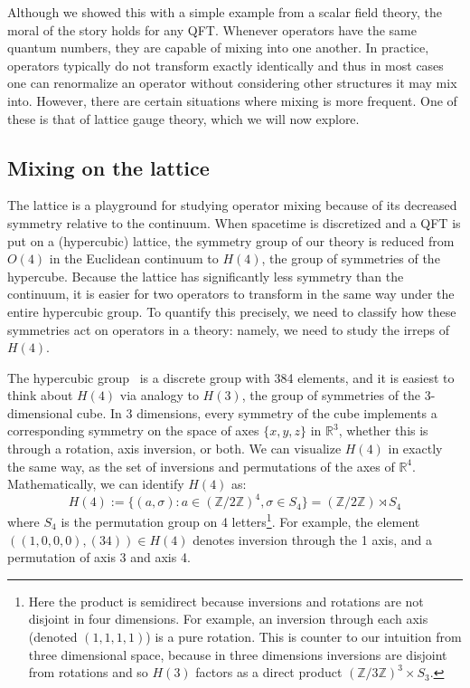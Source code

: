 \documentclass[11pt, oneside]{article}   	%
\theoremstyle{definition}
\begin{document}
Although we showed this with a simple example from a scalar field theory, the moral of the story holds for any QFT. 
Whenever operators have the same quantum numbers, they are capable of mixing into one another. In practice, 
operators typically do not transform exactly identically and thus in most cases one can renormalize an operator 
without considering other structures it may mix into. However, there are certain situations where mixing is more frequent. 
One of these is that of lattice gauge theory, which we will now explore. 

\subsection{Mixing on the lattice}

The lattice is a playground for studying operator mixing because of its decreased symmetry relative to the continuum. 
When spacetime is discretized and a QFT is put on a (hypercubic) lattice, the symmetry group of our theory is 
reduced from $O(4)$ in the Euclidean continuum to $H(4)$, the group of symmetries of the hypercube. Because 
the lattice has significantly less symmetry than the continuum, it is easier for two operators to transform in the 
same way under the entire hypercubic group. To quantify this precisely, we need to classify how these symmetries 
act on operators in a theory: namely, we need to study the irreps of $H(4)$. 

The hypercubic group~\cite{hypercubic} is a discrete group with 384 elements, and it is easiest to think about $H(4)$ via 
analogy to $H(3)$, the group of symmetries of the 3-dimensional cube. In 3 dimensions, every symmetry of the cube 
implements a corresponding symmetry on the space of axes $\{x, y, z\}$ in $\mathbb R^3$, whether this is through a 
rotation, axis inversion, or both. We can visualize $H(4)$ in exactly the same way, as the set of inversions and 
permutations of the axes of $\mathbb R^4$. Mathematically, we can identify $H(4)$ as:
\begin{equation}
	H(4) := \{(a, \sigma) : a\in (\mathbb Z / 2\mathbb Z)^4, \sigma\in S_4\} = (\mathbb Z / 2\mathbb Z) \rtimes 
	S_4
\end{equation}
where $S_4$ is the permutation group on 4 letters\footnote{Here the product is semidirect because inversions and 
rotations are not disjoint in four dimensions. For example, an inversion through each axis (denoted $(1, 1, 1, 1)$) is a 
pure rotation. This is counter to our intuition from three dimensional space, because in three dimensions inversions are 
disjoint from rotations and so $H(3)$ factors as a direct product $(\mathbb Z / 3\mathbb Z)^3\times S_3$.}. For example, 
the element $((1, 0, 0, 0), (34))\in H(4)$ denotes inversion through the 1 axis, and a permutation of axis 3 and axis 4. 
\end{document}
